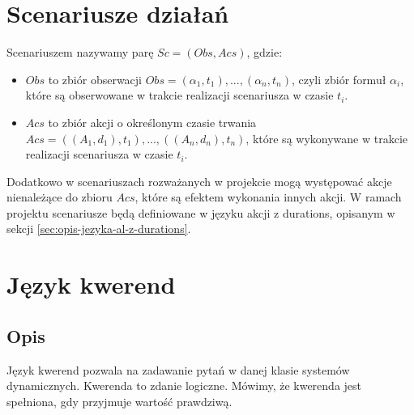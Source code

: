 \documentclass{article}
\begin{document}
\section{Scenariusze działań}
Scenariuszem nazywamy parę $Sc = (Obs, Acs)$, gdzie:
\begin{itemize}
	\item $Obs$ to zbiór obserwacji $Obs = {(\alpha_1, t_1), ..., (\alpha_n, t_n)}$, czyli zbiór formuł $\alpha_i$, które są obserwowane w trakcie realizacji scenariusza w czasie $t_i$.
	\item $Acs$ to zbiór akcji o określonym czasie trwania $Acs = {((A_1, d_1), t_1), ..., ((A_n, d_n), t_n)}$, które są wykonywane w trakcie realizacji scenariusza w czasie $t_i$.
\end{itemize}

\noindent Dodatkowo w scenariuszach rozważanych w projekcie mogą występować akcje nienależące do zbioru $Acs$, które są efektem wykonania innych akcji. W ramach projektu scenariusze będą definiowane w języku akcji z durations, opisanym w sekcji \ref{sec:opis-jezyka-al-z-durations}.

\section{Język kwerend}

\subsection{Opis}
Język kwerend pozwala na zadawanie pytań w danej klasie systemów dynamicznych. Kwerenda to zdanie logiczne. Mówimy, że kwerenda jest spełniona, gdy przyjmuje wartość prawdziwą.
\end{document}
